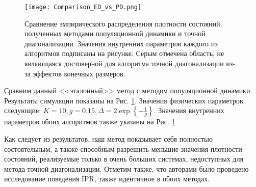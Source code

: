 \begin{figure}[h!]
	\label{fig:Comparison_PD_vs_ED}
	\centering
	\texttt{[image: Comparison\_ED\_vs\_PD.png]}
	\caption{Сравнение эмпирического распределения плотности состояний, полученных методами популяционной динамики и точной диагонализации. Значения внутренних параметров каждого из алгоритмов подписаны на рисунке. Серым отмечена область, не являющаяся достоверной для алгоритма точной диагонализации из-за эффектов конечных размеров.}
\end{figure}

Сравним данный <<эталонный>> метод с методом популяционной динамики. Результаты симуляции показаны на Рис. \ref{fig:Comparison_PD_vs_ED}. Значения физических параметров следующие: $ K = 10, g = 0.15 , \Delta = 2 \exp\left\{ -\frac{1}{g} \right\}$. Значения внутренних параметров обоих алгоритмов также указаны на Рис. \ref{fig:Comparison_PD_vs_ED}

Как следует из результатов, наш метод показывает себя полностью состоятельным, а также способным разрешить меньшие значения плотности состояний, реализуемые только в очень больших системах, недоступных для метода точной диагонализации. Отметим также, что авторами было проведено исследование поведения IPR, также идентичное в обоих методах.


